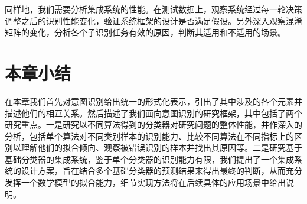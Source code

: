 同样地，我们需要分析集成系统的性能。在测试数据上，观察系统经过每一轮决策调整之后的识别性能变化，验证系统框架的设计是否满足假设。另外深入观察混淆矩阵的变化，分析各个子识别任务有效的原因，判断其适用和不适用的场景。

\section{本章小结}

在本章我们首先对意图识别给出统一的形式化表示，引出了其中涉及的各个元素并描述他们的相互关系。然后描述了我们面向意图识别的研究框架，其中包括了两个研究重点。一是研究以不同算法得到的分类器对研究问题的整体性能，并作深入的分析，包括单个算法对不同类别样本的识别能力、比较不同算法在不同指标上的区别以理解他们的拟合倾向、观察被错误识别的样本并找出其原因等。二是研究基于基础分类器的集成系统，鉴于单个分类器的识别能力有限，我们提出了一个集成系统的设计方案，旨在结合多个基础分类器的预测结果来得出最终的判断，从而充分发挥一个数学模型的拟合能力，细节实现方法将在后续具体的应用场景中给出说明。



